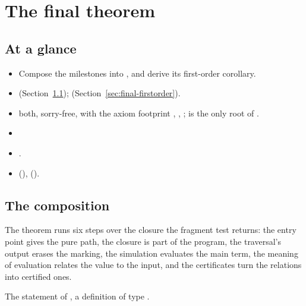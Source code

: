 \chapter{The final theorem}\label{chap:final}

\section*{At a glance}
\begin{itemize}
\item {} Compose the milestones into , and derive its first-order corollary.
\item {}  (Section~\ref{sec:final-theorem});  (Section~\ref{sec:final-firstorder}).
\item {} \stProved{} both, sorry-free, with the axiom footprint , , ;  is the only root of .
\item {} 
\item {} .
\item {}  (),  ().
\end{itemize}

\section{The composition}\label{sec:final-theorem}

The theorem runs six steps over the closure the fragment test returns: the entry point gives the pure path, the closure is part of the program, the traversal's output erases the marking, the simulation evaluates the main term, the meaning of evaluation relates the value to the input, and the certificates turn the relations into certified ones.

\begin{definition}
  \label{def:EraseProof-erase_correct-statement}
  \leanok
   The statement of , a definition of type .
\end{definition}

